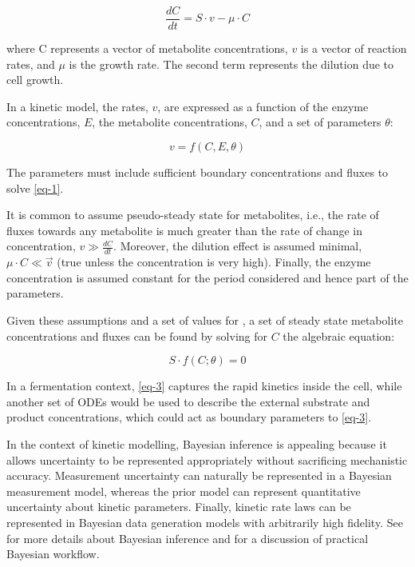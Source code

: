 \documentclass[journal=asbcd6,manuscript=article,layout=traditional]{achemso}
\begin{document}
\begin{equation}\label{eq-1}
\frac{dC}{dt} = S\cdot v - \mu\cdot C 
\end{equation}

where C represents a vector of metabolite concentrations, \(v\) is a
vector of reaction rates, and \(\mu\) is the growth rate. The second
term represents the dilution due to cell growth.

In a kinetic model, the rates, \(v\), are expressed as a function of the
enzyme concentrations, \(E\), the metabolite concentrations, \(C\), and
a set of parameters \(\theta\):

\begin{equation}\label{eq-2}
v = f(C, E, \theta)
\end{equation}

The parameters must include sufficient boundary concentrations and
fluxes to solve \eqref{eq-1}.

It is common to assume pseudo-steady state for metabolites, i.e., the
rate of fluxes towards any metabolite is much greater than the rate of
change in concentration, \(𝑣 \gg \frac{𝑑𝐶}{𝑑𝑡}\). Moreover, the dilution
effect is assumed minimal, \(\mu\cdot C \ll \vec{v}\) (true unless the
concentration is very high). Finally, the enzyme concentration is
assumed constant for the period considered and hence part of the
parameters.

Given these assumptions and a set of values for \theta, a set of steady
state metabolite concentrations and fluxes can be found by solving for
\(C\) the algebraic equation:

\begin{equation}\label{eq-3}
S\cdot f(C;\theta) = 0
\end{equation}

In a fermentation context, \eqref{eq-3} captures the rapid kinetics
inside the cell, while another set of ODEs would be used to describe the
external substrate and product concentrations, which could act as
boundary parameters to \eqref{eq-3}.

In the context of kinetic modelling, Bayesian inference is appealing
because it allows uncertainty to be represented appropriately without
sacrificing mechanistic accuracy. Measurement uncertainty can naturally
be represented in a Bayesian measurement model, whereas the prior model
can represent quantitative uncertainty about kinetic parameters.
Finally, kinetic rate laws can be represented in Bayesian data
generation models with arbitrarily high fidelity. See
\citet{gelmanBayesianDataAnalysis2020a} for more details about Bayesian
inference and \citet{gelmanBayesianWorkflow2020} for a discussion of
practical Bayesian workflow.
\end{document}
